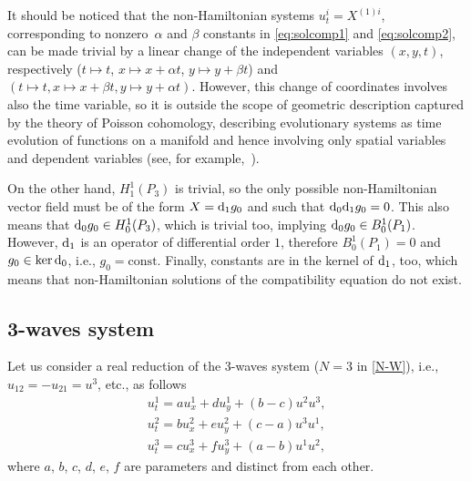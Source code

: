 \documentclass[10pt,a4paper]{amsart}
\numberwithin{equation}{section}
\begin{document}
It should be noticed that the non-Hamiltonian systems $u^i_t=X^{(1)i}$, corresponding to nonzero~$\alpha$ and $\beta$ constants in \eqref{eq:solcomp1} and \eqref{eq:solcomp2}, can be made trivial by a linear change of the independent variables $(x,y,t)$, respectively ($t\mapsto t$, $x\mapsto x+\alpha t$, $y\mapsto y+\beta t$) and $(t\mapsto t, x\mapsto x+\beta t, y\mapsto y+\alpha t)$. However, this change of coordinates involves also the time variable, so it is outside the scope of geometric description captured by the theory of Poisson cohomology, describing evolutionary systems as time evolution of functions on a manifold and hence involving only spatial variables and dependent variables (see, for example,~\cite{ccs17}).

On the other hand, $H^1_1(P_3)$ is trivial, so the only possible non-Hamiltonian vector field must be of the form $X={\rm d}_1g_0$ and such that ${\rm d}_0{\rm d}_1g_0=0$. This also means that ${\rm d}_0g_0\in H^1_0(P_3)$, which is trivial too, implying ${\rm d}_0g_0\in B^1_0(P_1)$. However, ${\rm d}_1$ is an operator of differential order $1$, therefore $B^1_0(P_1)=0$ and $g_0\in\ker {\rm d}_0$, i.e., $g_0=\mathrm{const}$. Finally, constants are in the kernel of ${\rm d}_1$, too, which means that non-Hamiltonian solutions of the compatibility equation do not exist.

\subsection{3-waves system}
Let us consider a real reduction of the 3-waves system ($N=3$ in \eqref{N-W}), i.e., $u_{12}=-u_{21}=u^3$, etc., as follows
\begin{gather}
u^1_t=au^1_x+du^1_y+(b-c)u^2u^3,\nonumber\\
u^2_t=bu^2_x+eu^2_y+(c-a)u^3u^1,\nonumber\\
u^3_t=cu^3_x+fu^3_y+(a-b)u^1u^2,\label{3-waves}
\end{gather}
where $a$, $b$, $c$, $d$, $e$, $f$ are parameters and distinct from each other.
\end{document}
